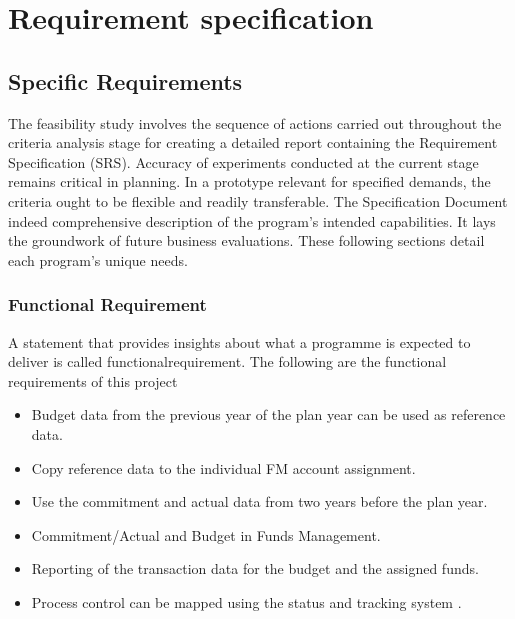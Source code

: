 
\chapter{Requirement specification}


\section{Specific Requirements}
The feasibility study involves the sequence of actions carried out throughout the criteria
analysis stage for creating a detailed report containing the Requirement Specification (SRS).
Accuracy of experiments conducted at the current stage remains critical in planning. In a
prototype relevant for specified demands, the criteria ought to be flexible and readily
transferable. The Specification Document indeed comprehensive description of the program's
intended capabilities. It lays the groundwork of future business evaluations.
These following sections detail each program's unique needs.

\subsection{Functional Requirement}
A statement that provides insights about what a programme is expected to deliver is called
functionalrequirement. The following are the functional requirements of this project

\begin{itemize}
    \item Budget data from the previous year of the plan year can be used as reference data.
    \item Copy reference data to the individual FM account assignment.
    \item Use the commitment and actual data from two years before the plan year. 
    \item Commitment/Actual and Budget in Funds Management.
    \item Reporting of the transaction data for the budget and the assigned funds.
    \item Process control can be mapped using the status and tracking system .
    
\end{itemize}

